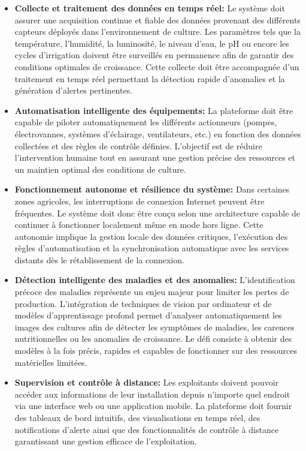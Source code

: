 \begin{itemize}
	
	\item \textbf{Collecte et traitement des données en temps réel: } 	
	Le système doit assurer une acquisition continue et fiable des données provenant des différents capteurs déployés dans l’environnement de culture. Les paramètres tels que la température, l’humidité, la luminosité, le niveau d’eau, le pH ou encore les cycles d’irrigation doivent être surveillés en permanence afin de garantir des conditions optimales de croissance. Cette collecte doit être accompagnée d’un traitement en temps réel permettant la détection rapide d’anomalies et la génération d’alertes pertinentes.
	
	\item \textbf{Automatisation intelligente des équipements: } 	
	La plateforme doit être capable de piloter automatiquement les différents actionneurs (pompes, électrovannes, systèmes d’éclairage, ventilateurs, etc.) en fonction des données collectées et des règles de contrôle définies. L’objectif est de réduire l’intervention humaine tout en assurant une gestion précise des ressources et un maintien optimal des conditions de culture.
	
	\item \textbf{Fonctionnement autonome et résilience du système: } 
	Dans certaines zones agricoles, les interruptions de connexion Internet peuvent être fréquentes. Le système doit donc être conçu selon une architecture capable de continuer à fonctionner localement même en mode hors ligne. Cette autonomie implique la gestion locale des données critiques, l’exécution des règles d’automatisation et la synchronisation automatique avec les services distants dès le rétablissement de la connexion.
	
	\item \textbf{Détection intelligente des maladies et des anomalies: } 
	L’identification précoce des maladies représente un enjeu majeur pour limiter les pertes de production. L’intégration de techniques de vision par ordinateur et de modèles d’apprentissage profond permet d’analyser automatiquement les images des cultures afin de détecter les symptômes de maladies, les carences nutritionnelles ou les anomalies de croissance. Le défi consiste à obtenir des modèles à la fois précis, rapides et capables de fonctionner sur des ressources matérielles limitées.
	
	\item \textbf{Supervision et contrôle à distance: } 
	Les exploitants doivent pouvoir accéder aux informations de leur installation depuis n’importe quel endroit via une interface web ou une application mobile. La plateforme doit fournir des tableaux de bord intuitifs, des visualisations en temps réel, des notifications d’alerte ainsi que des fonctionnalités de contrôle à distance garantissant une gestion efficace de l’exploitation.
	

\end{itemize}
